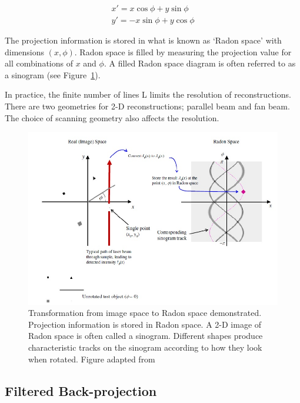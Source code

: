 \documentclass[12pt]{article}
\begin{document}
\begin{equation}
\begin{aligned}
x' = x\cos\phi + y\sin\phi \\
y' = -x\sin\phi + y\cos\phi
\end{aligned}
\end{equation}

The projection information is stored in what is known as `Radon space' with dimensions $(x, \phi)$. Radon space is filled by measuring the projection value for all combinations of $x$ and $\phi$. A filled Radon space diagram is often referred to as a sinogram (see Figure~\ref{fig:sinogram}).

In practice, the finite number of lines L limits the resolution of reconstructions. There are two geometries for 2-D reconstructions; parallel beam and fan beam. The choice of scanning geometry also affects the resolution. \cite{natterer2001mathematics}

\begin{figure}[H]
\centering
\includegraphics[width=\textwidth]{Doran_2008_sinogram.jpg}
\caption{Transformation from image space to Radon space demonstrated. Projection information is stored in Radon space. A 2-D image of Radon space is often called a sinogram. Different shapes produce characteristic tracks on the sinogram according to how they look when rotated. Figure adapted from \cite{Doran:2008kh}}
\label{fig:sinogram}
\end{figure}









\subsection{Filtered Back-projection}
\label{subsec:FBP}
\end{document}
